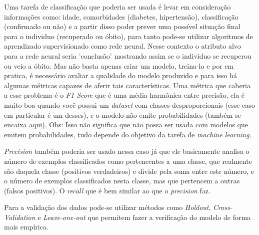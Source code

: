 Uma tarefa de classificação que poderia ser usada é levar em consideração informações como: idade, comorbidades (diabetes, hipertensão), classificação (confirmado ou não) e a partir disso poder prever uma possível situação final para o individuo (recuperado ou óbito), para tanto pode-se utilizar algoritmos de aprendizado supervisionado como rede neural. Nesse contexto o atributo alvo para a rede neural seria 'conclusão' mostrando assim se o individuo se recuperou ou veio a óbito. Mas não basta apenas criar um modelo, treina-lo e por em pratica, é necessário avaliar a qualidade do modelo produzido e para isso há algumas métricas capazes de aferir tais características. Uma métrica que caberia a esse problema é o \textit{F1 Score} que é uma média harmônica entre precisão, ela é muito boa quando você possui um \textit{dataset} com classes desproporcionais (esse caso em particular é um desses), e o modelo não emite probabilidades (também se encaixa aqui). Obs: Isso não significa que não possa ser usada com modelos que emitem probabilidades, tudo depende do objetivo da tarefa de \textit{machine learning}.

\textit{Precision} também poderia ser usado nessa caso já que ele basicamente analisa o número de exemplos classificados como pertencentes a uma classe, que realmente são daquela classe (positivos verdadeiros) e divide pela soma entre este número, e o número de exemplos classificados nesta classe, mas que pertencem a outras (falsos positivos). O \textit{recall} que é bem similar ao que o \textit{precision} faz.

Para a validação dos dados pode-se utilizar métodos como \textit{Holdout}, \textit{Cross-Validation} e \textit{Leave-one-out} que permitem fazer a verificação do modelo de forma mais empírica.